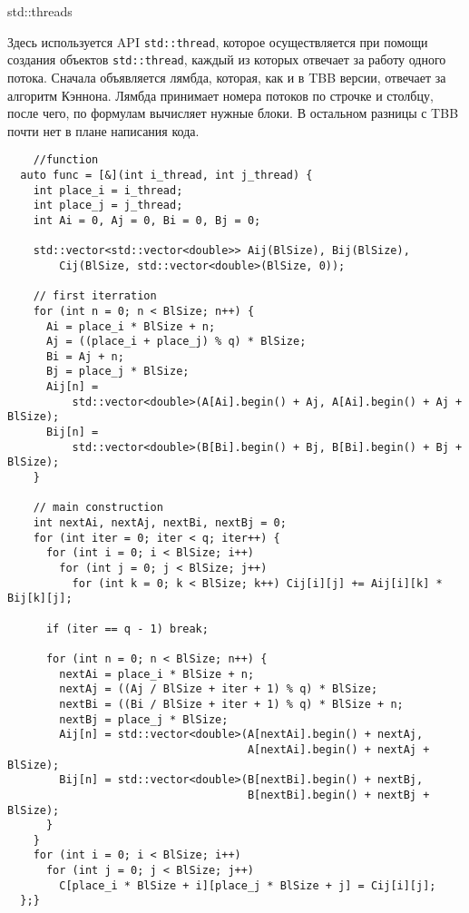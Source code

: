 \documentclass{report}
\begin{document}
\par std::threads
\par Здесь используется API \verb|std::thread|, которое осуществляется при помощи создания объектов \verb|std::thread|, каждый из которых отвечает за работу одного потока.
Сначала объявляется лямбда, которая, как и в TBB версии, отвечает за алгоритм Кэннона. Лямбда принимает номера потоков по строчке и столбцу, после чего, по формулам вычисляет нужные блоки. В остальном разницы с TBB почти нет в плане написания кода.
\begin{lstlisting}
    //function
  auto func = [&](int i_thread, int j_thread) {
    int place_i = i_thread;
    int place_j = j_thread;
    int Ai = 0, Aj = 0, Bi = 0, Bj = 0;

    std::vector<std::vector<double>> Aij(BlSize), Bij(BlSize),
        Cij(BlSize, std::vector<double>(BlSize, 0));

    // first iterration
    for (int n = 0; n < BlSize; n++) {
      Ai = place_i * BlSize + n;
      Aj = ((place_i + place_j) % q) * BlSize;
      Bi = Aj + n;
      Bj = place_j * BlSize;
      Aij[n] =
          std::vector<double>(A[Ai].begin() + Aj, A[Ai].begin() + Aj + BlSize);
      Bij[n] =
          std::vector<double>(B[Bi].begin() + Bj, B[Bi].begin() + Bj + BlSize);
    }

    // main construction
    int nextAi, nextAj, nextBi, nextBj = 0;
    for (int iter = 0; iter < q; iter++) {
      for (int i = 0; i < BlSize; i++)
        for (int j = 0; j < BlSize; j++)
          for (int k = 0; k < BlSize; k++) Cij[i][j] += Aij[i][k] * Bij[k][j];

      if (iter == q - 1) break;

      for (int n = 0; n < BlSize; n++) {
        nextAi = place_i * BlSize + n;
        nextAj = ((Aj / BlSize + iter + 1) % q) * BlSize;
        nextBi = ((Bi / BlSize + iter + 1) % q) * BlSize + n;
        nextBj = place_j * BlSize;
        Aij[n] = std::vector<double>(A[nextAi].begin() + nextAj,
                                     A[nextAi].begin() + nextAj + BlSize);
        Bij[n] = std::vector<double>(B[nextBi].begin() + nextBj,
                                     B[nextBi].begin() + nextBj + BlSize);
      }
    }
    for (int i = 0; i < BlSize; i++)
      for (int j = 0; j < BlSize; j++)
        C[place_i * BlSize + i][place_j * BlSize + j] = Cij[i][j];
  };}
\end{lstlisting}

\newpage

\end{document}
